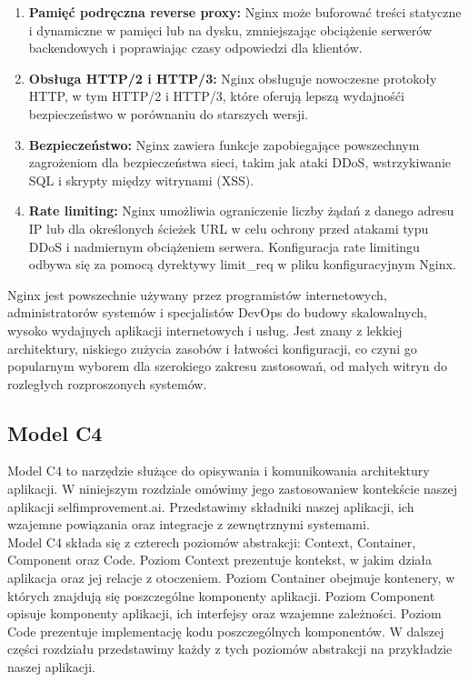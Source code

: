 \begin{enumerate}
\item {\bf Pamięć podręczna reverse proxy:}
Nginx może buforować treści statyczne i dynamiczne w pamięci lub na dysku, zmniejszając obciążenie serwerów backendowych i poprawiając czasy odpowiedzi dla klientów.

\item {\bf Obsługa HTTP/2 i HTTP/3:}
Nginx obsługuje nowoczesne protokoły HTTP, w tym HTTP/2 i HTTP/3, które oferują lepszą wydajność\linebreak i bezpieczeństwo w porównaniu do starszych wersji.

\item {\bf Bezpieczeństwo:}
Nginx zawiera funkcje zapobiegające powszechnym zagrożeniom dla bezpieczeństwa sieci, takim jak ataki DDoS, wstrzykiwanie SQL i skrypty między witrynami (XSS).

\item {\bf Rate limiting:}
Nginx umożliwia ograniczenie liczby żądań z danego adresu IP lub dla określonych ścieżek URL w celu ochrony przed atakami typu DDoS i nadmiernym obciążeniem serwera. Konfiguracja rate limitingu odbywa się za pomocą dyrektywy limit\_req w pliku konfiguracyjnym Nginx.

\end{enumerate}

Nginx jest powszechnie używany przez programistów internetowych, administratorów systemów i specjalistów DevOps do budowy skalowalnych, wysoko wydajnych aplikacji internetowych i usług. Jest znany z lekkiej architektury, niskiego zużycia zasobów i łatwości konfiguracji, co czyni go popularnym wyborem dla szerokiego zakresu zastosowań, od małych witryn do rozległych rozproszonych systemów.

\subsection{Model C4}
Model C4 to narzędzie służące do opisywania i komunikowania architektury aplikacji. W niniejszym rozdziale omówimy jego zastosowanie\linebreak w kontekście naszej aplikacji selfimprovement.ai. Przedstawimy składniki naszej aplikacji, ich wzajemne powiązania oraz integracje z zewnętrznymi systemami.\\

Model C4 składa się z czterech poziomów abstrakcji: Context, Container, Component oraz Code. Poziom Context prezentuje kontekst, w jakim działa aplikacja oraz jej relacje z otoczeniem. Poziom Container obejmuje kontenery, w których znajdują się poszczególne komponenty aplikacji. Poziom Component opisuje komponenty aplikacji, ich interfejsy oraz wzajemne zależności. Poziom Code prezentuje implementację kodu poszczególnych komponentów. W dalszej części rozdziału przedstawimy każdy z tych poziomów abstrakcji na przykładzie naszej aplikacji.

